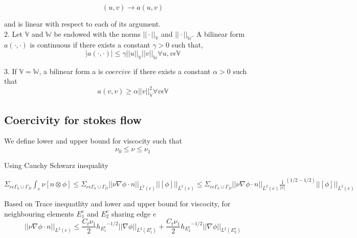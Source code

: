 \documentclass[a4paper,10pt]{book}
\begin{document}
\begin{equation}
(u,v) \rightarrow a(u,v)
\end{equation}

and is linear with respect to each of its argument.\\

2. Let $\mathbb{V}$ and $\mathbb{W}$ be endowed with the norms $||\cdot||_\mathbb{V}$ and $||\cdot||_\mathbb{W}$. A bilinear form $a(\cdot,\cdot)$ is continuous if there exists a constant $\gamma > 0$ such that,\\
\begin{equation}
|a(\cdot,\cdot)| \leq \gamma ||u||_\mathbb{V} ||v||_\mathbb{W} \forall u,v \epsilon \mathbb{V}
\end{equation}

3. If $\mathbb{V} = \mathbb{W}$, a bilinear form a is $coercive$ if there exists a constant $\alpha > 0$ such that \\
\begin{equation}
a(v,v) \geq \alpha ||v||_\mathbb{V}^2 \forall v \epsilon \mathbb{V}
\end{equation}

\subsection{Coercivity for stokes flow} \label{basics}

We define lower and upper bound for viscocity such that \\
\begin{equation}
\nu_0 \leq \nu \leq \nu_1
\end{equation}

Using Cauchy Schwarz inequality

$\Sigma_{e \epsilon \Gamma_h \cup \Gamma_D} \int_e {\nu}[n\otimes \phi] \leq \Sigma_{e \epsilon \Gamma_h \cup \Gamma_D} ||\nu \nabla \phi \cdot n||_{L^2(e)} ||[\phi]||_{L^2(e)} \leq \Sigma_{e \epsilon \Gamma_h \cup \Gamma_D} ||\nu \nabla \phi \cdot n||_{L^2(e)} {\frac{1}{|e|}}^{(1/2-1/2)} ||[\phi]||_{L^2(e)}$

Based on Trace inequatlity and lower and upper bound for viscocity, for neighbouring elements $E_1^e$ and $E_2^e$ sharing edge $e$ 
\begin{equation}
||{\nu \nabla \phi \cdot n}||_{L^2(e)} \leq \frac{C_t \nu_1}{2} {h_{E_1^e}}^{-1/2} ||\nabla \phi||_{L^2(E_1^e)} + \frac{C_t \nu_1}{2} {h_{E_2^e}}^{-1/2} ||\nabla \phi||_{L^2(E_2^e)}
\end{equation}
\end{document}
